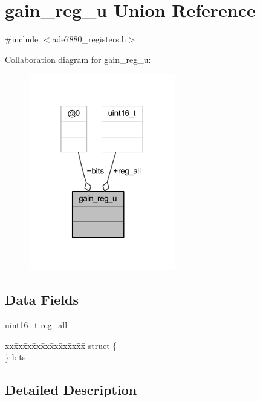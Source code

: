 \hypertarget{a00025}{\section{gain\-\_\-reg\-\_\-u Union Reference}
\label{d3/dfe/a00025}
}


{\ttfamily \#include $<$ade7880\-\_\-registers.\-h$>$}



Collaboration diagram for gain\-\_\-reg\-\_\-u\-:\nopagebreak
\begin{figure}[H]
\begin{center}
\leavevmode
\includegraphics[width=181pt]{db/ddf/a00088}
\end{center}
\end{figure}
\subsection*{Data Fields}
\begin{DoxyCompactItemize}
\item 
uint16\-\_\-t \hyperlink{a00025_a74e4d0cc3da3b66723322f38bfb7f371}{reg\-\_\-all}
\item 
\begin{tabbing}
xx\=xx\=xx\=xx\=xx\=xx\=xx\=xx\=xx\=\kill
struct \{\\
\} \hyperlink{a00025_a8cca68b956b956a298c740d89ece0840}{bits}\\

\end{tabbing}\end{DoxyCompactItemize}


\subsection{Detailed Description}



